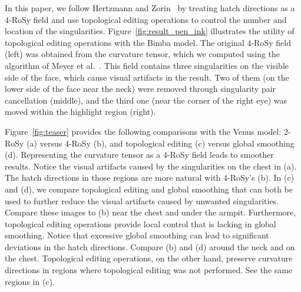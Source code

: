 \documentclass{acmsiggraph}               %
\begin{document}
In this paper, we follow Hertzmann and
Zorin~ by treating hatch directions as a
$4$-RoSy field and use topological editing operations to control the
number and location of the singularities.
Figure~\ref{fig:result_pen_ink} illustrates the utility of
topological editing operations with the Bimba model. The original
$4$-RoSy field (left) was obtained from the curvature tensor, which
we computed using the algorithm of Meyer et
al.~. This field contains three singularities on
the visible side of the face, which cause visual artifacts in the
result. Two of them (on the lower side of the face near the neck)
were removed through singularity pair cancellation (middle), and the
third one (near the corner of the right eye) was moved within the
highlight region (right).

Figure~\ref{fig:teaser} provides the following comparisons with the
Venus model: $2$-RoSy (a) versus $4$-RoSy (b), and topological
editing (c) versus global smoothing (d). Representing the curvature
tensor as a $4$-RoSy field leads to smoother results. Notice the
visual artifacts caused by the singularities on the chest in (a).
The hatch directions in those regions are more natural with
$4$-RoSy's (b). In (c) and (d), we compare topological editing and
global smoothing that can both be used to further reduce the visual
artifacts caused by unwanted singularities. Compare these images to
(b) near the chest and under the armpit. Furthermore, topological
editing operations provide local control that is lacking in global
smoothing. Notice that excessive global smoothing can lead to
significant deviations in the hatch directions. Compare (b) and (d)
around the neck and on the chest. Topological editing operations, on
the other hand, preserve curvature directions in regions where
topological editing was not performed. See the same regions in (c).

\end{document}
